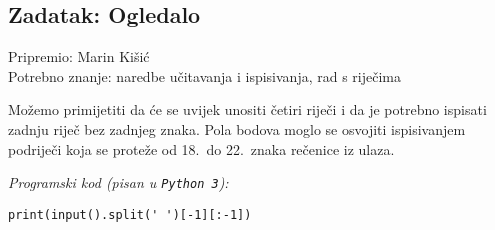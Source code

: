 \subsection*{Zadatak: Ogledalo}
\textsf{Pripremio: Marin Kišić}\\
\textsf{Potrebno znanje: naredbe učitavanja i ispisivanja, rad s riječima}

Možemo primijetiti da će se uvijek unositi četiri riječi i da je potrebno
ispisati zadnju riječ bez zadnjeg znaka. Pola bodova moglo se osvojiti
ispisivanjem podriječi koja se proteže od 18.\ do 22.\ znaka rečenice iz ulaza.

\textit{Programski kod (pisan u \texttt{Python 3}):}

\vspace{-2ex}
\begin{verbatim}
print(input().split(' ')[-1][:-1])
\end{verbatim}
